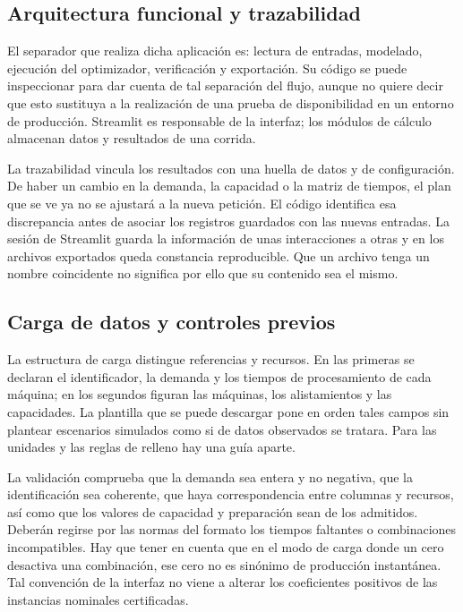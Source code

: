 \subsection{Arquitectura funcional y trazabilidad}
El separador que realiza dicha aplicación es: lectura de entradas, modelado, ejecución del optimizador, verificación y exportación. Su código se puede inspeccionar para dar cuenta de tal separación del flujo, aunque no quiere decir que esto sustituya a la realización de una prueba de disponibilidad en un entorno de producción. Streamlit es responsable de la interfaz; los módulos de cálculo almacenan datos y resultados de una corrida.

La trazabilidad vincula los resultados con una huella de datos y de configuración. De haber un cambio en la demanda, la capacidad o la matriz de tiempos, el plan que se ve ya no se ajustará a la nueva petición. El código identifica esa discrepancia antes de asociar los registros guardados con las nuevas entradas. La sesión de Streamlit guarda la información de unas interacciones a otras \cite{streamlit} y en los archivos exportados queda constancia reproducible. Que un archivo tenga un nombre coincidente no significa por ello que su contenido sea el mismo.

\subsection{Carga de datos y controles previos}
La estructura de carga distingue referencias y recursos. En las primeras se declaran el identificador, la demanda y los tiempos de procesamiento de cada máquina; en los segundos figuran las máquinas, los alistamientos y las capacidades. La plantilla que se puede descargar pone en orden tales campos sin plantear escenarios simulados como si de datos observados se tratara. Para las unidades y las reglas de relleno hay una guía aparte.

La validación comprueba que la demanda sea entera y no negativa, que la identificación sea coherente, que haya correspondencia entre columnas y recursos, así como que los valores de capacidad y preparación sean de los admitidos. Deberán regirse por las normas del formato los tiempos faltantes o combinaciones incompatibles. Hay que tener en cuenta que en el modo de carga donde un cero desactiva una combinación, ese cero no es sinónimo de producción instantánea. Tal convención de la interfaz no viene a alterar los coeficientes positivos de las instancias nominales certificadas.

